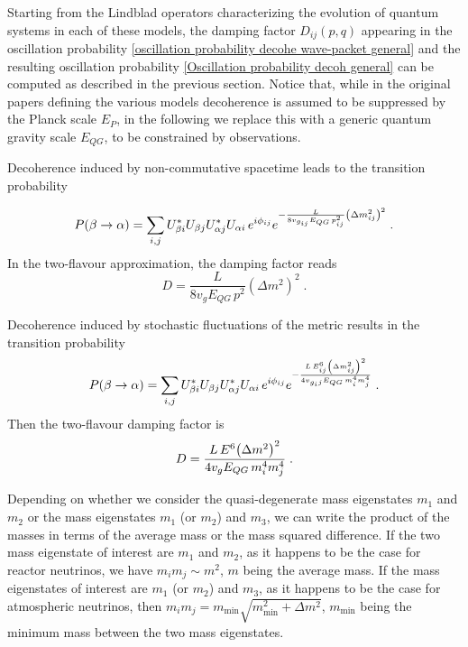 \documentclass[11pt]{article}
\begin{document}
Starting from the Lindblad operators characterizing the evolution of quantum systems in each of these models, the damping factor $D_{ij}(p,q)$ appearing in the oscillation probability \eqref{oscillation probability decohe wave-packet general} and the resulting oscillation probability \eqref{Oscillation probability decoh general} can be computed as described in the previous section. Notice that, while in the original papers defining the various models decoherence is assumed to be suppressed by the Planck scale $E_P$, in the following we replace this with a generic quantum gravity scale $E_{QG}$, to be constrained by observations. %

Decoherence induced by non-commutative spacetime \cite{Arzano:2022nlo} leads to the transition probability 

\begin{equation}
    P(\beta\to\alpha)  = \sum_{i,j} U^*_{\beta i} U_{\beta j} U^*_{\alpha j} U_{\alpha i} \,e^{i \phi_{ij}} e^{-\frac{L}{8v_{g_{ij}}E_{QG}\,p^2_{ij}}\qty(\Delta m_{ij}^2)^2}\;.\label{Oscillation probability decoh arzano}
\end{equation}
In the two-flavour approximation, the damping factor reads
\begin{equation}\label{damping factor 2 flavours arzano}
    D = \frac{L}{8v_gE_{QG} \,p^2}(\Delta m^2)^2\;.
\end{equation}




Decoherence induced by stochastic fluctuations of the metric \cite{Breuer:2008rh} results in the transition probability 
    \begin{equation}
        P(\beta\to\alpha) = \sum_{i,j} U^*_{\beta i} U_{\beta j} U^*_{\alpha j} U_{\alpha i} \,e^{i \phi_{ij}} e^{-\frac{L\,E_{ij}^6 \qty(\Delta m^2_{ij})^2}{4v_{g_ij}E_{QG}\,m_i^4m_j^4}}\;.\label{Oscillation probability decoh Breuer}
    \end{equation}
Then the two-flavour damping factor is \begin{equation}\label{damping factor 2 flavours analysis Breuer}
        D = \frac{L\,E^6 \qty(\Delta m^2)^2}{4v_{g}E_{QG}\,m_i^4m_j^4}\;.
    \end{equation}

Depending on whether we consider the quasi-degenerate mass eigenstates $m_1$ and $m_2$ or the mass eigenstates $m_1$ (or $m_2$) and $m_3$, we can write the product of the masses in terms of the average mass or the mass squared difference. If the two mass eigenstate of interest are $m_1$ and $m_2$, as it happens to be the case for reactor neutrinos, we have $m_im_j \sim m^2$, $m$ being the average mass. If the mass eigenstates of interest are $m_1$ (or $m_2$) and $m_3$, as it happens to be the case for atmospheric neutrinos, then  $m_im_j = m_{\text{min}}\sqrt{m^2_{\text{min}}+\Delta m^2}$, $m_{\text{min}}$ being the minimum mass between the two mass eigenstates.
    
\end{document}
